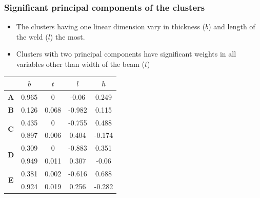 \documentclass[svgnames, table, smaller]{beamer}
\begin{document}
\begin{frame}
  \frametitle{Significant principal components of the clusters}

  \begin{itemize}
  \item The clusters having one linear dimension vary in thickness ($b$)
    and length of the weld ($l$) the most.
  \item Clusters with two principal components have significant weights in
    all variables other than width of the beam ($t$)
  \end{itemize}

  \begin{table}[!ht]
    \centering
    \begin{tabular}{c|c|c|c|c|}
      \cline{2-5}
      & $b$ & $t$ & $ l$  & $h$ \\
      \hline
      \multicolumn{1}{|c|}{\textbf{A}} & 0.965 & 0 & -0.06 & 0.249 \\
      \hline
      \multicolumn{1}{|c|}{\textbf{B}} & 0.126 & 0.068 & -0.982 & 0.115\\
      \hline
      \multicolumn{1}{|c|}{\multirow{2}{*}{\textbf{C}}} & 0.435 & 0 & -0.755 & 0.488 \\ \cline{2-5}
      \multicolumn{1}{|c|}{}& 0.897 & 0.006 & 0.404 & -0.174\\
      \hline
      \multicolumn{1}{|c|}{\multirow{2}{*}{\textbf{D}}} & 0.309 & 0 & -0.883 & 0.351 \\ \cline{2-5}
      \multicolumn{1}{|c|}{}& 0.949 & 0.011 & 0.307 & -0.06\\
      \hline
      \multicolumn{1}{|c|}{\multirow{2}{*}{\textbf{E}}} & 0.381 & 0.002 & -0.616 & 0.688 \\ \cline{2-5}
      \multicolumn{1}{|c|}{}& 0.924 & 0.019 & 0.256 & -0.282\\
      \hline
    \end{tabular}
    \label{first2wbeamPCs}
  \end{table}





\end{frame}
\end{document}
